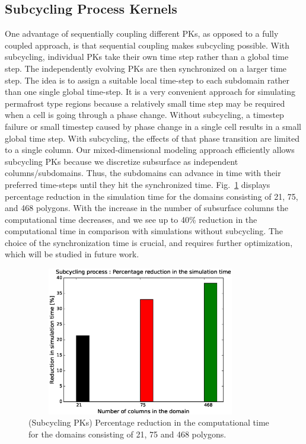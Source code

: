 \documentclass[review]{elsarticle}
\begin{document}
\subsection{Subcycling Process Kernels}
One advantage of sequentially coupling different PKs, as opposed to a fully coupled approach, is that sequential coupling makes subcycling possible. With subcycling, individual PKs take their own time step rather than a global time step. The independently evolving PKs are then synchronized on a larger time step. The idea is to assign a suitable local time-step to each subdomain rather than one single global time-step. It is a very convenient approach for simulating permafrost type regions because a relatively small time step may be required when a cell is going through a phase change. Without subcycling, a timestep failure or small timestep caused by phase change in a single cell results in a small global time step. With subcycling, the effects of that phase transition are limited to a single column.  Our mixed-dimensional modeling approach efficiently allows subcycling PKs because we discretize subsurface as independent columns/subdomains. Thus, the subdomains can advance in time with their preferred time-steps until they hit the synchronized time. Fig.~\ref{subcycle-time-reduciton} displays percentage reduction in the simulation time for the domains consisting of 21, 75, and 468 polygons. With the increase in the number of subsurface columns the computational time decreases, and we see up to 40\% reduction in the computational time in comparison with simulations without subcycling. The choice of the synchronization time is crucial, and requires further optimization, which will be studied in future work.

\begin{figure}[!htpb]
\centering
\includegraphics[height = 6.5cm, width=10cm]{figures/subcycle-time-reduciton.eps}
\caption{(Subcycling PKs) Percentage reduction in the computational time for the domains consisting of 21, 75 and 468 polygons. }
\label{subcycle-time-reduciton}
\end{figure}
\end{document}
